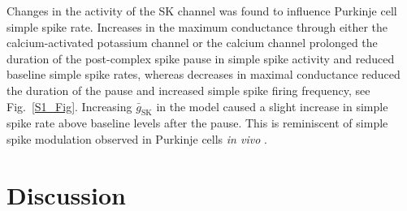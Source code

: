 \documentclass[utf8]{frontiersSCNS} %
\newcommand{\msi}{\,\mathrm{mS cm^{-2}}}
\newcommand{\sk}{\mathrm{SK}}
\begin{document}

Changes in the activity of the SK channel was found to influence
Purkinje cell simple spike rate. Increases in the maximum conductance
through either the calcium-activated potassium channel or the calcium
channel prolonged the duration of the post-complex spike pause in
simple spike activity and reduced baseline simple spike rates, whereas
decreases in maximal conductance reduced the duration of the pause and
increased simple spike firing frequency, see
Fig.~\ref{S1_Fig}. Increasing $\bar{g}_\sk$ in the model caused a
slight increase in simple spike rate above baseline levels after the
pause. This is reminiscent of simple spike modulation observed in
Purkinje cells \textsl{in vivo} \cite{BurroughsEtAl2016}.



\section{Discussion}
\end{document}
